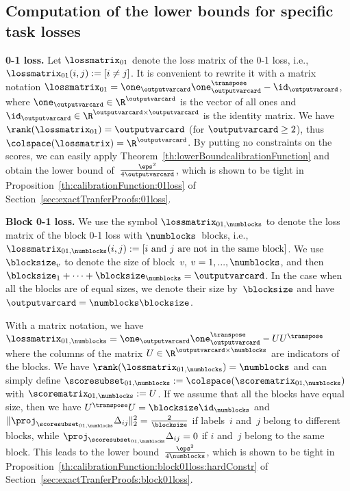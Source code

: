 \documentclass{article}
\begin{document}
\subsection{Computation of the lower bounds for specific task losses}
\label{sec:bounds:interpretations}
\textbf{0-1 loss.}
Let $\lossmatrix_{01}$ denote the loss matrix of the 0-1 loss, i.e., $\lossmatrix_{01}(i, j) := [i \neq j]$.
It is convenient to rewrite it with a matrix notation $\lossmatrix_{01} = \one_\outputvarcard \one_\outputvarcard^\transpose - \id_\outputvarcard$, where $\one_\outputvarcard \in \R^\outputvarcard$ is the vector of all ones and $\id_\outputvarcard \in \R^{\outputvarcard\times\outputvarcard}$ is the identity matrix.
We have $\rank(\lossmatrix_{01}) = \outputvarcard$ (for $\outputvarcard \geq 2$), thus $\colspace(\lossmatrix) = \R^\outputvarcard$.
By putting no constraints on the scores, we can easily apply Theorem~\ref{th:lowerBoundcalibrationFunction} and obtain the lower bound of~$\frac{\eps^2}{4\outputvarcard}$, which is shown to be tight in Proposition~\ref{th:calibrationFunction:01loss} of Section~\ref{sec:exactTranferProofs:01loss}.

\textbf{Block 0-1 loss.}
We use the symbol $\lossmatrix_{01,\numblocks}$ to denote the loss matrix of the block 0-1 loss with $\numblocks$~blocks, i.e., $\lossmatrix_{01,\numblocks}(i, j) := [\text{$i$ and $j$ are not in the same block}]$.
We use $\blocksize_v$ to denote the size of block~$v$, $v=1,...,\numblocks$, and then $\blocksize_1 +\dots + \blocksize_\numblocks = \outputvarcard$.
In the case when all the blocks are of equal sizes, we denote their size by~$\blocksize$ and have~$\outputvarcard = \numblocks \blocksize$.

With a matrix notation, we have $\lossmatrix_{01,\numblocks} = \one_\outputvarcard \one_\outputvarcard^\transpose - UU^\transpose$ where the columns of the matrix $U\in \R^{\outputvarcard \times \numblocks}$ are indicators of the blocks.
We have $\rank(\lossmatrix_{01,\numblocks}) = \numblocks$ and can simply define $\scoresubset_{01,\numblocks} := \colspace(\scorematrix_{01,\numblocks})$ with  $\scorematrix_{01,\numblocks} := U$.
If we assume that all the blocks have equal size, then we have $U^\transpose U = \blocksize \id_\numblocks$ and $\|\proj_{\scoresubset_{01,\numblocks}}\Delta_{ij}\|_2^2=\frac{2}{\blocksize}$ if labels~$i$ and~$j$ belong to different blocks, while $\proj_{\scoresubset_{01,\numblocks}}\Delta_{ij}=0$ if $i$ and~$j$ belong to the same block.  This leads to the lower bound~$\frac{\eps^2}{4\numblocks}$, which is shown to be tight in Proposition~\ref{th:calibrationFunction:block01loss:hardConstr} of Section~\ref{sec:exactTranferProofs:block01loss}.
\end{document}
